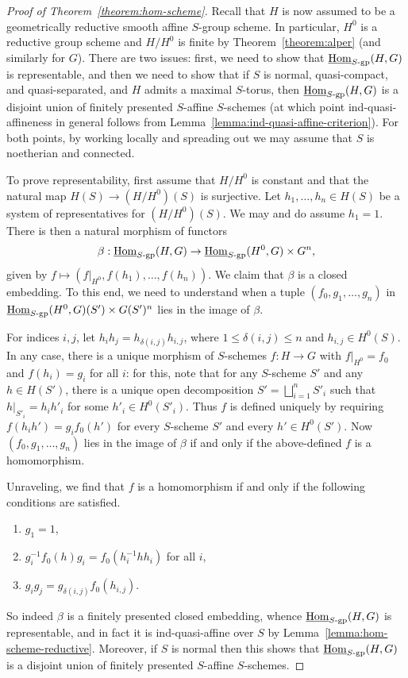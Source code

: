 \documentclass[11pt, letterpaper,english]{amsart}
\theoremstyle{plain}
\theoremstyle{definition}
\numberwithin{equation}{section}
\numberwithin{lem}{section}
\DeclareMathOperator{\Hom}{Hom}
\begin{document}
\begin{proof}[Proof of Theorem~\ref{theorem:hom-scheme}]
Recall that $H$ is now assumed to be a geometrically reductive smooth affine $S$-group scheme. In particular, $H^0$ is a reductive group scheme and $H/H^0$ is finite by Theorem~\ref{theorem:alper} (and similarly for $G$). There are two issues: first, we need to show that $\underline{\Hom}_{S\textrm{-}\rm{gp}}(H, G)$ is representable, and then we need to show that if $S$ is normal, quasi-compact, and quasi-separated, and $H$ admits a maximal $S$-torus, then $\underline{\Hom}_{S\textrm{-}\rm{gp}}(H, G)$ is a disjoint union of finitely presented $S$-affine $S$-schemes (at which point ind-quasi-affineness in general follows from Lemma~\ref{lemma:ind-quasi-affine-criterion}). For both points, by working locally and spreading out we may assume that $S$ is noetherian and connected. \smallskip

To prove representability, first assume that $H/H^0$ is constant and that the natural map $H(S) \to (H/H^0)(S)$ is surjective. Let $h_1, \dots, h_n \in H(S)$ be a system of representatives for $(H/H^0)(S)$. We may and do assume $h_1 = 1$. There is then a natural morphism of functors
\[
\beta: \underline{\Hom}_{S\textrm{-}\rm{gp}}(H, G) \to \underline{\Hom}_{S\textrm{-}\rm{gp}}(H^0, G) \times G^n,
\]
given by $f \mapsto (f|_{H^0}, f(h_1), \dots, f(h_n))$. We claim that $\beta$ is a closed embedding. To this end, we need to understand when a tuple $(f_0, g_1, \dots, g_n)$ in $\underline{\Hom}_{S\textrm{-}\rm{gp}}(H^0, G)(S') \times G(S')^n$ lies in the image of $\beta$. \smallskip

For indices $i, j$, let $h_i h_j = h_{\delta(i, j)} h_{i,j}$, where $1 \leq \delta(i, j) \leq n$ and $h_{i,j} \in H^0(S)$. In any case, there is a unique morphism of $S$-schemes $f: H \to G$ with $f|_{H^0} = f_0$ and $f(h_i) = g_i$ for all $i$: for this, note that for any $S$-scheme $S'$ and any $h \in H(S')$, there is a unique open decomposition $S' = \bigsqcup_{i=1}^n S'_i$ such that $h|_{S'_i} = h_i h'_i$ for some $h'_i \in H^0(S'_i)$. 
Thus $f$ is defined uniquely by requiring $f(h_i h') = g_i f_0(h')$ for every $S$-scheme $S'$ and every $h' \in H^0(S')$. Now $(f_0, g_1, \dots, g_n)$ lies in the image of $\beta$ if and only if the above-defined $f$ is a homomorphism. \smallskip

Unraveling, we find that $f$ is a homomorphism if and only if the following conditions are satisfied.
\begin{enumerate}
    \item $g_1 = 1$,
    \item $g_i^{-1} f_0(h) g_i = f_0(h_i^{-1} h h_i)$ for all $i$,
    \item $g_i g_j = g_{\delta(i, j)} f_0(h_{i,j})$.
\end{enumerate}
So indeed $\beta$ is a finitely presented closed embedding, whence $\underline{\Hom}_{S\textrm{-}\rm{gp}}(H, G)$ is representable, and in fact it is ind-quasi-affine over $S$ by Lemma~\ref{lemma:hom-scheme-reductive}. Moreover, if $S$ is normal then this shows that $\underline{\Hom}_{S\textrm{-}\rm{gp}}(H, G)$ is a disjoint union of finitely presented $S$-affine $S$-schemes.\smallskip


\end{proof}
\end{document}
